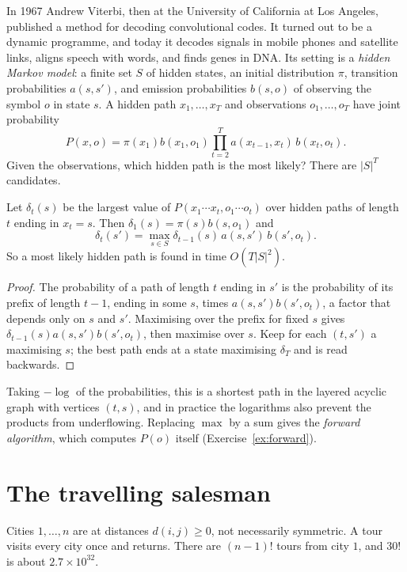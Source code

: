 In 1967 Andrew Viterbi, then at the University of California at Los Angeles, published a method for decoding convolutional codes. It turned out to be a dynamic programme, and today it decodes signals in
mobile phones and satellite links, aligns speech with words, and finds genes in DNA. Its setting is a \emph{hidden Markov model}: a finite set $S$ of hidden states, an initial distribution $\pi$, transition
probabilities $a(s,s')$, and emission probabilities $b(s,o)$ of observing the symbol $o$ in state $s$. A hidden path $x_1,\dots,x_T$ and observations $o_1,\dots,o_T$ have joint probability
\[
P(x,o)=\pi(x_1)b(x_1,o_1)\prod_{t=2}^Ta(x_{t-1},x_t)\,b(x_t,o_t).
\]
Given the observations, which hidden path is the most likely? There are $|S|^T$ candidates.

\begin{theorem}[Viterbi, 1967]\label{thm:viterbi}
Let $\delta_t(s)$ be the largest value of $P(x_1\cdots x_t,o_1\cdots o_t)$ over hidden paths of length $t$ ending in $x_t=s$. Then $\delta_1(s)=\pi(s)b(s,o_1)$ and
\[
\delta_t(s')=\max_{s\in S}\delta_{t-1}(s)\,a(s,s')\,b(s',o_t).
\]
So a most likely hidden path is found in time $O(T|S|^2)$.
\end{theorem}
\begin{proof}
The probability of a path of length $t$ ending in $s'$ is the probability of its prefix of length $t-1$, ending in some $s$, times $a(s,s')b(s',o_t)$, a factor that depends only on $s$ and $s'$. Maximising over the prefix for fixed $s$
gives $\delta_{t-1}(s)a(s,s')b(s',o_t)$, then maximise over $s$. Keep for each $(t,s')$ a maximising $s$; the best path ends at a state maximising $\delta_T$ and is read backwards.
\end{proof}

Taking $-\log$ of the probabilities, this is a shortest path in the layered acyclic graph with vertices $(t,s)$, and in practice the logarithms also prevent the products from underflowing. Replacing $\max$ by a sum gives
the \emph{forward algorithm}, which computes $P(o)$ itself (Exercise~\ref{ex:forward}).

\section{The travelling salesman}\label{sec:heldkarp}

Cities $1,\dots,n$ are at distances $d(i,j)\ge0$, not necessarily symmetric. A tour visits every city once and returns. There are $(n-1)!$ tours from city $1$, and $30!$ is about $2.7\times10^{32}$.


